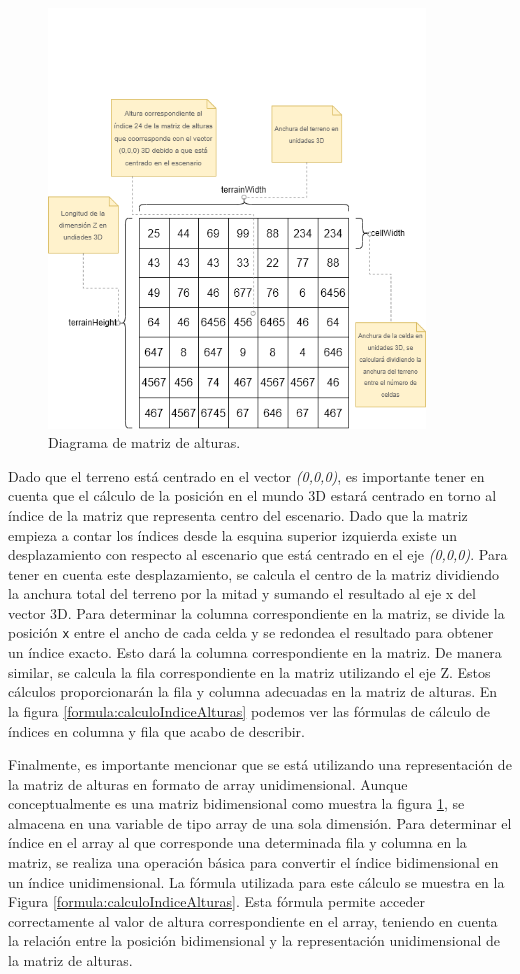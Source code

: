 \documentclass[a4paper, 11pt]{book}
\begin{document}
\begin{figure}[h]
  \centering
  \includegraphics[width=10cm, keepaspectratio]{img/terrain.drawio.png}
  \caption{Diagrama de matriz de alturas.}
  \label{fig:terrainDrawio}
\end{figure}
Dado que el terreno está centrado en el vector \emph{(0,0,0)}, es importante tener en cuenta que el cálculo de la posición en el mundo \textsc{3D} estará centrado en torno al índice de la matriz que representa centro del escenario. 
Dado que la matriz empieza a contar los índices desde la esquina superior izquierda existe un desplazamiento con respecto al escenario que está centrado en el eje \emph{(0,0,0)}.
Para tener en cuenta este desplazamiento, se calcula el centro de la matriz dividiendo la anchura total del terreno por la mitad y sumando el resultado al eje x del vector 3D. 
Para determinar la columna correspondiente en la matriz, se divide la posición \texttt{x} entre el ancho de cada celda y se redondea el resultado para obtener un índice exacto. Esto dará la columna correspondiente en la matriz. 
De manera similar, se calcula la fila correspondiente en la matriz utilizando el eje Z. Estos cálculos proporcionarán la fila y columna adecuadas en la matriz de alturas.
En la figura \ref{formula:calculoIndiceAlturas} podemos ver las fórmulas de cálculo de índices en columna y fila que acabo de describir.

Finalmente, es importante mencionar que se está utilizando una representación de la matriz de alturas en formato de array unidimensional. Aunque conceptualmente es una matriz bidimensional como muestra la figura \ref{fig:terrainDrawio}, se almacena en una variable de tipo array de una sola dimensión. 
Para determinar el índice en el array al que corresponde una determinada fila y columna en la matriz, se realiza una operación básica para convertir el índice bidimensional en un índice unidimensional.
La fórmula utilizada para este cálculo se muestra en la Figura \ref{formula:calculoIndiceAlturas}. Esta fórmula permite acceder correctamente al valor de altura correspondiente en el array, teniendo en cuenta la relación entre la posición bidimensional y la representación unidimensional de la matriz de alturas.
\end{document}
